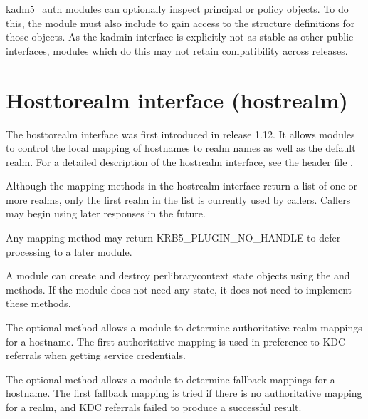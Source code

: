 \documentclass[letterpaper,10pt,english]{sphinxmanual}
\begin{document}
\sphinxAtStartPar
kadm5\_auth modules can optionally inspect principal or policy objects.
To do this, the module must also include  to gain
access to the structure definitions for those objects.  As the kadmin
interface is explicitly not as stable as other public interfaces,
modules which do this may not retain compatibility across releases.

\sphinxstepscope


\section{Host\sphinxhyphen{}to\sphinxhyphen{}realm interface (hostrealm)}
\label{\detokenize{plugindev/hostrealm:host-to-realm-interface-hostrealm}}\label{\detokenize{plugindev/hostrealm:hostrealm-plugin}}\label{\detokenize{plugindev/hostrealm::doc}}
\sphinxAtStartPar
The host\sphinxhyphen{}to\sphinxhyphen{}realm interface was first introduced in release 1.12.  It
allows modules to control the local mapping of hostnames to realm
names as well as the default realm.  For a detailed description of the
hostrealm interface, see the header file
.

\sphinxAtStartPar
Although the mapping methods in the hostrealm interface return a list
of one or more realms, only the first realm in the list is currently
used by callers.  Callers may begin using later responses in the
future.

\sphinxAtStartPar
Any mapping method may return KRB5\_PLUGIN\_NO\_HANDLE to defer
processing to a later module.

\sphinxAtStartPar
A module can create and destroy per\sphinxhyphen{}library\sphinxhyphen{}context state objects
using the  and  methods.  If the module does not need
any state, it does not need to implement these methods.

\sphinxAtStartPar
The optional  method allows a module to determine
authoritative realm mappings for a hostname.  The first authoritative
mapping is used in preference to KDC referrals when getting service
credentials.

\sphinxAtStartPar
The optional  method allows a module to determine
fallback mappings for a hostname.  The first fallback mapping is tried
if there is no authoritative mapping for a realm, and KDC referrals
failed to produce a successful result.
\end{document}
